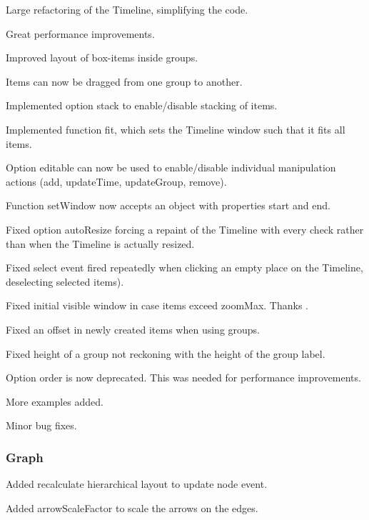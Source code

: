 \begin{DoxyItemize}
\item Large refactoring of the Timeline, simplifying the code.
\item Great performance improvements.
\item Improved layout of box-\/items inside groups.
\item Items can now be dragged from one group to another.
\item Implemented option {\ttfamily stack} to enable/disable stacking of items.
\item Implemented function {\ttfamily fit}, which sets the Timeline window such that it fits all items.
\item Option {\ttfamily editable} can now be used to enable/disable individual manipulation actions ({\ttfamily add}, {\ttfamily update\+Time}, {\ttfamily update\+Group}, {\ttfamily remove}).
\item Function {\ttfamily set\+Window} now accepts an object with properties {\ttfamily start} and {\ttfamily end}.
\item Fixed option {\ttfamily auto\+Resize} forcing a repaint of the Timeline with every check rather than when the Timeline is actually resized.
\item Fixed {\ttfamily select} event fired repeatedly when clicking an empty place on the Timeline, deselecting selected items).
\item Fixed initial visible window in case items exceed {\ttfamily zoom\+Max}. Thanks .
\item Fixed an offset in newly created items when using groups.
\item Fixed height of a group not reckoning with the height of the group label.
\item Option {\ttfamily order} is now deprecated. This was needed for performance improvements.
\item More examples added.
\item Minor bug fixes.
\end{DoxyItemize}

\subsubsection*{Graph}


\begin{DoxyItemize}
\item Added recalculate hierarchical layout to update node event.
\item Added arrow\+Scale\+Factor to scale the arrows on the edges.
\end{DoxyItemize}

